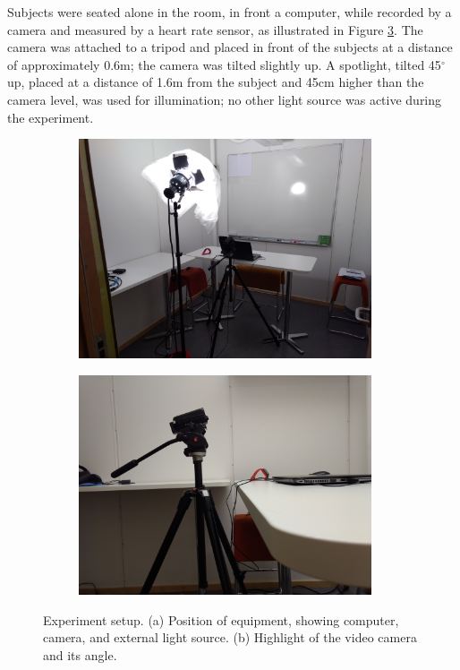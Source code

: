 Subjects were seated alone in the room, in front a computer, while recorded by a camera and measured by a heart rate sensor, as illustrated in Figure \ref{fig:experiment2-setup}. The camera was attached to a tripod and placed in front of the subjects at a distance of approximately 0.6m; the camera was tilted slightly up. A spotlight, tilted 45$^{\circ}$ up, placed at a distance of 1.6m from the subject and 45cm higher than the camera level, was used for illumination; no other light source was active during the experiment.

\begin{figure}[ht]
\centering
  \begin{subfigure}[b]{0.5\textwidth}
    \includegraphics[width=0.95\textwidth]{Content/figures/experiment2-setup-overall}
    \caption{}
    \label{fig:experiment2-setup-overall}
  \end{subfigure}%
  \begin{subfigure}[b]{0.5\textwidth}
    \centering
    \includegraphics[width=0.95\textwidth]{Content/figures/experiment2-setup-camera}
    \caption{}
    \label{fig:experiment2-setup-camera}
  \end{subfigure}
  \caption{Experiment setup. (a) Position of equipment, showing computer, camera, and external light source. (b) Highlight of the video camera and its angle.}
  \label{fig:experiment2-setup}
\end{figure}

